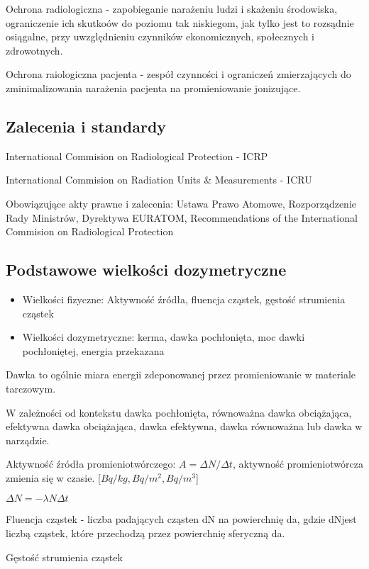 \documentclass{article}
\begin{document}
Ochrona radiologiczna - zapobieganie narażeniu ludzi i skażeniu środowiska, ograniczenie ich skutkoów do poziomu tak niskiegom, jak tylko jest to rozsądnie osiągalne, przy uwzględnieniu czynników ekonomicznych, społecznych i zdrowotnych.

Ochrona raiologiczna pacjenta - zespół czynności i ograniczeń zmierzających do zminimalizowania narażenia pacjenta na promieniowanie jonizujące.

\subsection{Zalecenia i standardy}

International Commision on Radiological Protection - ICRP

International Commision on Radiation Units \& Measurements - ICRU

Obowiązujące akty prawne i zalecenia: Ustawa Prawo Atomowe, Rozporządzenie Rady Ministrów, Dyrektywa EURATOM, Recommendations of the International Commision on Radiological Protection

\subsection{Podstawowe wielkości dozymetryczne}

\begin{itemize}
    \item Wielkości fizyczne: Aktywność źródła, fluencja cząstek, gęstość strumienia cząstek
    \item Wielkości dozymetryczne: kerma, dawka pochłonięta, moc dawki pochłoniętej, energia przekazana
\end{itemize}

Dawka to ogólnie miara energii zdeponowanej przez promieniowanie w materiale tarczowym.

W zależności od kontekstu dawka pochłonięta, równoważna dawka obciążająca, efektywna dawka obciążająca, dawka efektywna, dawka równoważna lub dawka w narządzie.

Aktywność źródła promieniotwórczego: $A = \Delta N / \Delta t$, aktywność promieniotwórcza zmienia się w czasie. [$Bq/kg, Bq/m^2, Bq/m^3$]

$\Delta N = - \lambda N \Delta t$

Fluencja cząstek - liczba padających cząsten dN na powierchnię da, gdzie dNjest liczbą cząstek, które przechodzą przez powierchnię sferyczną da.

Gęstość strumienia cząstek
\end{document}
